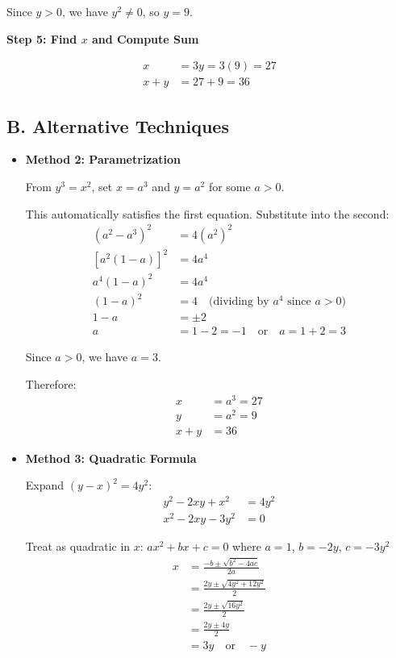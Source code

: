 \documentclass[12pt]{article}
\begin{document}
\begin{techniquesbox}
\begin{itemize}[leftmargin=*]
    Since $y > 0$, we have $y^2 \neq 0$, so $y = 9$.
    
    \textbf{Step 5: Find $x$ and Compute Sum}
    
    \begin{align*}
    x &= 3y = 3(9) = 27\\
    x + y &= 27 + 9 = 36
    \end{align*}
\end{itemize}

\subsection*{B. Alternative Techniques}
\begin{itemize}[leftmargin=*]
    \item \textbf{Method 2: Parametrization}
    
    From $y^3 = x^2$, set $x = a^3$ and $y = a^2$ for some $a > 0$.
    
    This automatically satisfies the first equation. Substitute into the second:
    \begin{align*}
    (a^2 - a^3)^2 &= 4(a^2)^2\\
    [a^2(1-a)]^2 &= 4a^4\\
    a^4(1-a)^2 &= 4a^4\\
    (1-a)^2 &= 4 \quad \text{(dividing by } a^4 \text{ since } a > 0)\\
    1 - a &= \pm 2\\
    a &= 1 - 2 = -1 \quad \text{or} \quad a = 1 + 2 = 3
    \end{align*}
    
    Since $a > 0$, we have $a = 3$.
    
    Therefore:
    \begin{align*}
    x &= a^3 = 27\\
    y &= a^2 = 9\\
    x + y &= 36
    \end{align*}
    
    \item \textbf{Method 3: Quadratic Formula}
    
    Expand $(y-x)^2 = 4y^2$:
    \begin{align*}
    y^2 - 2xy + x^2 &= 4y^2\\
    x^2 - 2xy - 3y^2 &= 0
    \end{align*}
    
    Treat as quadratic in $x$: $ax^2 + bx + c = 0$ where $a=1$, $b=-2y$, $c=-3y^2$
    \begin{align*}
    x &= \frac{-b \pm \sqrt{b^2 - 4ac}}{2a}\\
    &= \frac{2y \pm \sqrt{4y^2 + 12y^2}}{2}\\
    &= \frac{2y \pm \sqrt{16y^2}}{2}\\
    &= \frac{2y \pm 4y}{2}\\
    &= 3y \quad \text{or} \quad -y
    \end{align*}
    

\end{itemize}
\end{techniquesbox}
\end{document}
